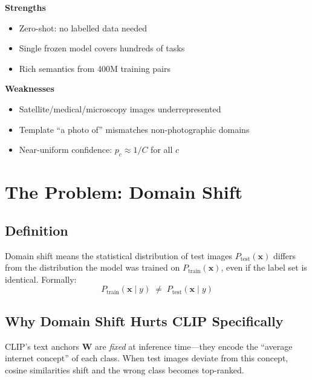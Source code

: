 \documentclass[12pt,a4paper]{article}
\newcommand{\bx}{\mathbf{x}}
\newcommand{\bW}{\mathbf{W}}
\newcommand{\1}{\mathbf{1}}
\begin{document}
\begin{minipage}[t]{0.48\textwidth}
\textbf{Strengths}
\begin{itemize}[leftmargin=1em,noitemsep]
  \item Zero-shot: no labelled data needed
  \item Single frozen model covers hundreds of tasks
  \item Rich semantics from 400M training pairs
\end{itemize}
\end{minipage}\hfill
\begin{minipage}[t]{0.48\textwidth}
\textbf{Weaknesses}
\begin{itemize}[leftmargin=1em,noitemsep]
  \item Satellite/medical/microscopy images underrepresented
  \item Template ``a photo of'' mismatches non-photographic domains
  \item Near-uniform confidence: $p_c \approx 1/C$ for all $c$
\end{itemize}
\end{minipage}

\section{The Problem: Domain Shift}

\subsection{Definition}

Domain shift means the statistical distribution of test images $P_{\text{test}}(\bx)$ differs from the distribution the model was trained on $P_{\text{train}}(\bx)$, even if the label set is identical.
Formally:
\begin{equation}
  P_{\text{train}}(\bx \mid y) \;\neq\; P_{\text{test}}(\bx \mid y)
  \label{eq:domain_shift}
\end{equation}

\subsection{Why Domain Shift Hurts CLIP Specifically}

CLIP's text anchors $\bW$ are \emph{fixed} at inference time---they encode the ``average internet concept'' of each class.
When test images deviate from this concept, cosine similarities shift and the wrong class becomes top-ranked.
\end{document}
